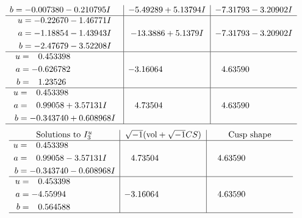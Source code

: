 \documentclass[1p]{elsarticle_modified}
\theoremstyle{definition}
\newcommand{\I}{\sqrt{-1}}
\begin{document}
$$\begin{array}{c|c|c}
\begin{aligned}
b &= -0.007380 - 0.210795 I\end{aligned}
 & -5.49289 + 5.13794 I & -7.31793 - 3.20902 I \\ \hline\begin{aligned}
u &= -0.22670 - 1.46771 I \\
a &= -1.18854 - 1.43943 I \\
b &= -2.47679 - 3.52208 I\end{aligned}
 & -13.3886 + 5.1379 I & -7.31793 - 3.20902 I \\ \hline\begin{aligned}
u &= \phantom{-}0.453398\phantom{ +0.000000I} \\
a &= -0.626782\phantom{ +0.000000I} \\
b &= \phantom{-}1.23526\phantom{ +0.000000I}\end{aligned}
 & -3.16064\phantom{ +0.000000I} & \phantom{-}4.63590\phantom{ +0.000000I} \\ \hline\begin{aligned}
u &= \phantom{-}0.453398\phantom{ +0.000000I} \\
a &= \phantom{-}0.99058 + 3.57131 I \\
b &= -0.343740 + 0.608968 I\end{aligned}
 & \phantom{-}4.73504\phantom{ +0.000000I} & \phantom{-}4.63590\phantom{ +0.000000I}\\
 \hline 
 \end{array}$$\newpage$$\begin{array}{c|c|c}  
\text{Solutions to }I^u_{3}& \I (\text{vol} + \sqrt{-1}CS) & \text{Cusp shape}\\
 \hline 
\begin{aligned}
u &= \phantom{-}0.453398\phantom{ +0.000000I} \\
a &= \phantom{-}0.99058 - 3.57131 I \\
b &= -0.343740 - 0.608968 I\end{aligned}
 & \phantom{-}4.73504\phantom{ +0.000000I} & \phantom{-}4.63590\phantom{ +0.000000I} \\ \hline\begin{aligned}
u &= \phantom{-}0.453398\phantom{ +0.000000I} \\
a &= -4.55994\phantom{ +0.000000I} \\
b &= \phantom{-}0.564588\phantom{ +0.000000I}\end{aligned}
 & -3.16064\phantom{ +0.000000I} & \phantom{-}4.63590\phantom{ +0.000000I}\\
 \hline 
 \end{array}$$\newpage\newpage\renewcommand{\arraystretch}{1}
\end{document}
